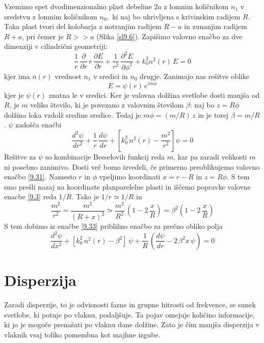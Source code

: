 Vzemimo spet dvodimenzionalno plast debeline $2a$ z lomnim količnikom
$n_{1}$ v sredstvu z lomnim količnikom $n_{0},$ ki naj bo ukrivljena
s krivinskim radijem $R$. Taka plast tvori del kolobarja z notranjim
radijem $R-a$ in zunanjim radijem $R+a$, pri čemer je $\dot{R}>>a$
(Slika \ref{sl9.6}). Zapišimo valovno enačbo za dve dimenziji v cilindrični
geometriji: 
\begin{equation}
\frac{1}{r}\,\frac{\partial}{\partial r}\, r\,\frac{\partial E}{\partial r}+\frac{1}{r^{2}}\,\frac{\partial^{2}E}{\partial\phi^{2}}+k_{0}^{2}n^{2}\left(r\right)\, E=0\label{9.31}
\end{equation}
 kjer ima $n\left(r\right)$ vrednost $n_{1}$ v sredici in $n_{0}$
drugje. Zanimajo nas rešitve oblike 
\begin{equation}
E=\psi\left(r\right)\, e^{im\phi}\label{9.32}
\end{equation}
 kjer je $\psi\left(r\right)$ znatna le v sredici. Ker je valovna
dolžina svetlobe dosti manjša od $R$, je $m$ veliko število, ki
je povezano z valovnim številom $\beta$: naj bo $z=R\phi$ dolžina
loka vzdolž sredine sredice. Tedaj je $m\phi=(m/R)\, z$ in je torej
$\beta=m/R$. $\psi$ zadošča enačbi 
\begin{equation}
\frac{d^{2}\psi}{dr^{2}}+\frac{1}{r}\,\frac{d\psi}{dr}+\left[k_{0}^{2}\, n^{2}\left(r\right)-\frac{m^{2}}{r^{2}}\right]\psi=0\label{9.33}
\end{equation}
 Rešitve za $\psi$ so kombinacije Besselovih funkcij reda $m$, kar
pa zaradi velikosti $m$ ni posebno zanimivo. Dosti več bomo izvedeli,
če primerno preoblikujemo valovno enačbo \ref{9.31}. Namesto $r$
in $\phi$ vpeljimo koordinati $x=r-R$ in $z=R\phi$. S tem smo prešli
nazaj na koordinate planparelelne plasti in iščemo popravke valovne
enacbe \ref{9.3} reda $1/R.$ Tako je $1/r\simeq1/R$ in 
\begin{equation}
\frac{m^{2}}{r^{2}}=\frac{m^{2}}{\left(R+x\right)^{2}}\simeq\frac{m^{2}}{R^{2}}\,\left(1-2\,\frac{x}{R}\right)=\beta^{2}\left(1-2\,\frac{x}{R}\right)\label{9.34}
\end{equation}
 S tem dobimo iz enačbe \ref{9.33} približno enačbo za prečno obliko
polja 
\begin{equation}
\frac{d^{2}\psi}{dx^{2}}+\left[k_{0}^{2}\, n^{2}\left(r\right)-\beta^{2}\right]\,\psi+\frac{1}{R}\,\left(\frac{d\psi}{dr}-2\,\beta^{2}x\,\psi\right)=0\label{9.35}
\end{equation}



\section{Disperzija}
\label{chap:Disperzija}
Zaradi disperzije, to je odvisnosti fazne in grupne hitrosti od frekvence,
se sunek svetlobe, ki potuje po vlaknu, podaljšuje. Ta pojav omejuje
količino informacije, ki jo je mogoče prenašati po vlaknu dane dolžine.
Zato je čim manjša disperzija v vlaknih vsaj toliko pomembna kot majhne
izgube.

